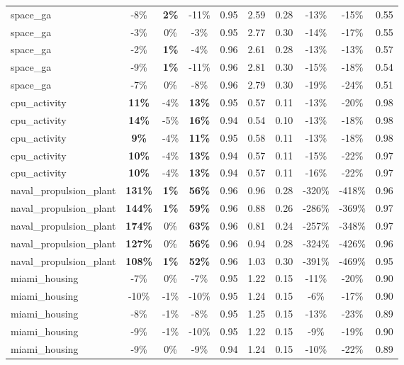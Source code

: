 \begin{table}[!htbp]
\begin{small}
\begin{sc}
{\begin{tabular}{lccccccccc}
space\_ga & -8\% & \textbf{2\%} & -11\% & 0.95 & 2.59 & 0.28 & -13\% & -15\% & 0.55 \\
space\_ga & -3\% & 0\% & -3\% & 0.95 & 2.77 & 0.30 & -14\% & -17\% & 0.55 \\
space\_ga & -2\% & \textbf{1\%} & -4\% & 0.96 & 2.61 & 0.28 & -13\% & -13\% & 0.57 \\
space\_ga & -9\% & \textbf{1\%} & -11\% & 0.96 & 2.81 & 0.30 & -15\% & -18\% & 0.54 \\
space\_ga & -7\% & 0\% & -8\% & 0.96 & 2.79 & 0.30 & -19\% & -24\% & 0.51 \\
cpu\_activity & \textbf{11\%} & -4\% & \textbf{13\%} & 0.95 & 0.57 & 0.11 & -13\% & -20\% & 0.98 \\
cpu\_activity & \textbf{14\%} & -5\% & \textbf{16\%} & 0.94 & 0.54 & 0.10 & -13\% & -18\% & 0.98 \\
cpu\_activity & \textbf{9\%} & -4\% & \textbf{11\%} & 0.95 & 0.58 & 0.11 & -13\% & -18\% & 0.98 \\
cpu\_activity & \textbf{10\%} & -4\% & \textbf{13\%} & 0.94 & 0.57 & 0.11 & -15\% & -22\% & 0.97 \\
cpu\_activity & \textbf{10\%} & -4\% & \textbf{13\%} & 0.94 & 0.57 & 0.11 & -16\% & -22\% & 0.97 \\
naval\_propulsion\_plant & \textbf{131\%} & \textbf{1\%} & \textbf{56\%} & 0.96 & 0.96 & 0.28 & -320\% & -418\% & 0.96 \\
naval\_propulsion\_plant & \textbf{144\%} & \textbf{1\%} & \textbf{59\%} & 0.96 & 0.88 & 0.26 & -286\% & -369\% & 0.97 \\
naval\_propulsion\_plant & \textbf{174\%} & 0\% & \textbf{63\%} & 0.96 & 0.81 & 0.24 & -257\% & -348\% & 0.97 \\
naval\_propulsion\_plant & \textbf{127\%} & 0\% & \textbf{56\%} & 0.96 & 0.94 & 0.28 & -324\% & -426\% & 0.96 \\
naval\_propulsion\_plant & \textbf{108\%} & \textbf{1\%} & \textbf{52\%} & 0.96 & 1.03 & 0.30 & -391\% & -469\% & 0.95 \\
miami\_housing & -7\% & 0\% & -7\% & 0.95 & 1.22 & 0.15 & -11\% & -20\% & 0.90 \\
miami\_housing & -10\% & -1\% & -10\% & 0.95 & 1.24 & 0.15 & -6\% & -17\% & 0.90 \\
miami\_housing & -8\% & -1\% & -8\% & 0.95 & 1.25 & 0.15 & -13\% & -23\% & 0.89 \\
miami\_housing & -9\% & -1\% & -10\% & 0.95 & 1.22 & 0.15 & -9\% & -19\% & 0.90 \\
miami\_housing & -9\% & 0\% & -9\% & 0.94 & 1.24 & 0.15 & -10\% & -22\% & 0.89 \\

\end{tabular}}
\end{sc}
\end{small}
\end{table}
